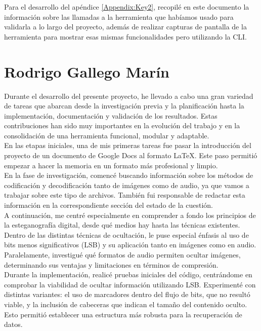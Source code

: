 Para el desarrollo del apéndice \ref{Appendix:Key2}, recopilé en este documento la información sobre las llamadas a la herramienta que habíamos usado para validarla a lo largo del proyecto, además de realizar capturas de pantalla de la herramienta para mostrar esas mismas funcionalidades pero utilizando  la CLI.
\newpage
\section*{Rodrigo Gallego Marín}
Durante el desarrollo del presente proyecto, he llevado a cabo una gran variedad de tareas que abarcan desde la investigación previa y la planificación hasta la implementación, documentación y validación de los resultados. Estas contribuciones han sido muy importantes en la evolución del trabajo y en la consolidación de una herramienta funcional, modular y adaptable.\\

En las etapas iniciales, una de mis primeras tareas fue pasar la introducción del proyecto de  un documento de Google Docs al formato LaTeX. Este paso permitió empezar a hacer la memoria en un formato más profesional y limpio.\\

En la fase de investigación, comencé buscando información sobre los métodos de codificación y decodificación tanto de imágenes como de audio, ya que vamos a trabajar sobre este tipo de archivos. También fui responsable de redactar esta información en la correspondiente sección del estado de la cuestión.\\

A continuación, me centré especialmente en comprender a fondo los principios de la esteganografía digital, desde qué medios hay hasta las técnicas existentes. Dentro de las distintas técnicas de ocultación, le puse especial énfasis al uso de bits menos significativos (LSB) y su aplicación tanto en imágenes como en audio. Paralelamente, investigué qué formatos de audio permiten ocultar imágenes, determinando sus ventajas y limitaciones en términos de compresión.\\

Durante la implementación, realicé pruebas iniciales del código, centrándome en comprobar la viabilidad de ocultar información utilizando LSB. Experimenté con distintas variantes: el uso de marcadores dentro del flujo de bits, que no resultó viable, y la inclusión de cabeceras que indican el tamaño del contenido oculto. Esto permitió establecer una estructura más robusta para la recuperación de datos.\\

